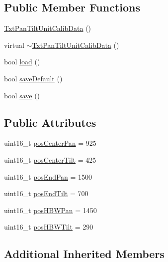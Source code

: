\subsection*{Public Member Functions}
\begin{DoxyCompactItemize}
\item 
\hyperlink{classft_1_1_txt_pan_tilt_unit_calib_data_aa9cf43084a47a88a5cd671e1baf5a4ed}{Txt\+Pan\+Tilt\+Unit\+Calib\+Data} ()
\item 
virtual \hyperlink{classft_1_1_txt_pan_tilt_unit_calib_data_aa017c7ba3640e1fe63bd25bbacd8fd89}{$\sim$\+Txt\+Pan\+Tilt\+Unit\+Calib\+Data} ()
\item 
bool \hyperlink{classft_1_1_txt_pan_tilt_unit_calib_data_a0b609395ddd55b69596d8026a6a5bbb4}{load} ()
\item 
bool \hyperlink{classft_1_1_txt_pan_tilt_unit_calib_data_aa18d6ee3e2f9971e86baf69fa90d14cf}{save\+Default} ()
\item 
bool \hyperlink{classft_1_1_txt_pan_tilt_unit_calib_data_a24f01720fce94850a038b68d5591895a}{save} ()
\end{DoxyCompactItemize}
\subsection*{Public Attributes}
\begin{DoxyCompactItemize}
\item 
uint16\+\_\+t \hyperlink{classft_1_1_txt_pan_tilt_unit_calib_data_ae282a52d59ac562a886f7418e1e10398}{pos\+Center\+Pan} = 925
\item 
uint16\+\_\+t \hyperlink{classft_1_1_txt_pan_tilt_unit_calib_data_a1cb6216eadb4251c610c9bf95a2ff0db}{pos\+Center\+Tilt} = 425
\item 
uint16\+\_\+t \hyperlink{classft_1_1_txt_pan_tilt_unit_calib_data_a738e7d6204407dcbf8dac8c7e0329ea5}{pos\+End\+Pan} = 1500
\item 
uint16\+\_\+t \hyperlink{classft_1_1_txt_pan_tilt_unit_calib_data_adf113240ac0f46355d5fc8738ca8543b}{pos\+End\+Tilt} = 700
\item 
uint16\+\_\+t \hyperlink{classft_1_1_txt_pan_tilt_unit_calib_data_a25e9ed80a6171dd57bf919b0a2cf4975}{pos\+H\+B\+W\+Pan} = 1450
\item 
uint16\+\_\+t \hyperlink{classft_1_1_txt_pan_tilt_unit_calib_data_a7f5468dcbb30dd4c6205603facb9d84d}{pos\+H\+B\+W\+Tilt} = 290
\end{DoxyCompactItemize}
\subsection*{Additional Inherited Members}


